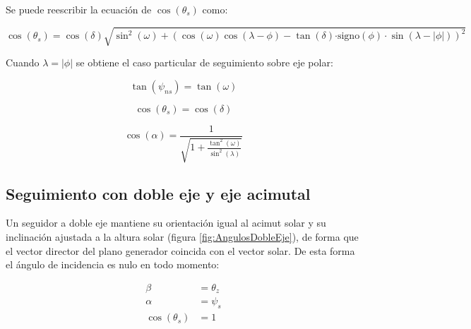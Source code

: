 Se puede reescribir la ecuación de $\cos(\theta_{s})$ como:

\begin{equation}
\cos(\theta_{s})=\cos(\delta)\sqrt{\sin^{2}(\omega)+\left(\cos(\omega)\cos(\lambda-\phi)-\tan(\delta)\mathrm{\cdot signo}(\phi)\cdot\sin(\lambda-|\phi|)\right)^{2}}\label{eq:cosThetaPolarFinal}\end{equation}


Cuando $\lambda=|\phi|$ se obtiene el caso particular de seguimiento
sobre eje polar:

\begin{equation}
\tan(\psi_{ns})=\tan(\omega)\end{equation}


\begin{equation}
\cos(\theta_{s})=\cos(\delta)\end{equation}


\begin{equation}
\cos(\alpha)=\frac{1}{\sqrt{1+\frac{\tan^{2}(\omega)}{\sin^{2}(\lambda)}}}\end{equation}



\subsection[Seguimiento doble eje]{Seguimiento con doble eje y eje acimutal}

Un seguidor a doble eje mantiene su orientación igual al acimut solar
y su inclinación ajustada a la altura solar (figura \ref{fig:AngulosDobleEje}),
de forma que el vector director del plano generador coincida con el
vector solar. De esta forma el ángulo de incidencia es nulo en todo
momento:

\begin{align}
\beta & =\theta_{z}\\
\alpha & =\psi_{s}\\
\cos(\theta_{s}) & =1\end{align}



